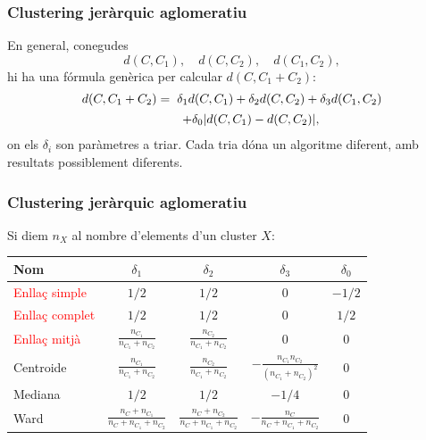 \documentclass[12pt,t]{beamer}
\newcommand{\red}[1]{\textcolor{red}{#1}}
\renewcommand{\emph}[1]{{\color{red}#1}}
\theoremstyle{plain}
\theoremstyle{definition}
\begin{document}
\begin{frame}
\frametitle{Clustering jeràrquic aglomeratiu}

En general, conegudes
$$
d(C,C_1),\quad d(C,C_2),\quad d(C_1,C_2),
$$
 hi ha una fórmula genèrica per calcular
$d(C,C_1+ C_2)$:
$$
\begin{array}{rl}
d(C,C_1+C_2)= &\hspace*{-1ex} \delta_1 d(C,C_1)+\delta_2 d(C,C_2)+\delta_3 d(C_1,C_2) \\[1ex] & + \delta_0 |d(C,C_1)-d(C,C_2)|,
\end{array}
$$
on els $\delta_i$ son paràmetres a triar.  Cada tria dóna un algoritme diferent, amb resultats possiblement diferents.

\end{frame}


\begin{frame}
\frametitle{Clustering jeràrquic aglomeratiu}
Si diem $n_X$ al nombre d'elements d'un cluster $X$:
\vskip 0.25cm

\begin{center}
\footnotesize \begin{tabular}{|l|@{}c|@{}c|@{}c|@{}c|}
\hline
Nom&$\delta_1$&$\delta_2$&$\delta_3$&$\delta_0$\\\hline
\red{Enllaç simple}\vphantom{$\displaystyle\int$} &$1/2$&$1/2$&$0$&$-1/2$\\\hline
\red{Enllaç complet}\vphantom{$\displaystyle\int$} &$1/2$&$1/2$&$0$&$1/2$\\\hline
\red{Enllaç mitjà}\vphantom{$\displaystyle\int_A^B$} &$\frac{n_{C_1}}{n_{C_1} + n_{C_2}}$&$\frac{n_{C_2}}{n_{C_1}+ n_{C_2}}$&$0$&$0$\\
\hline
Centroide\vphantom{$\displaystyle\int_A^B$} &$\frac{n_{C_1}}{n_{C_1} + n_{C_2}}$&$\frac{n_{C_2}}{n_{C_1} + n_{C_2}}$&$-\frac{n_{C_1} n_{C_2}}{(n_{C_1} + n_{C_2})^2}$&$0$\\\hline
Mediana\vphantom{$\displaystyle\int_A^B$} &$1/2$&$1/2$&$-1/4$&$0$\\\hline
\emph{Ward}\vphantom{$\displaystyle\int_A^B$} &$\frac{n_{C} + n_{C_1}}{n_C + n_{C_1} + n_{C_2}}$&$\frac{n_C + n_{C_2}}{n_C + n_{C_1}+ n_{C_2}}$&$-\frac{n_C}{n_C + n_{C_1} + n_{C_2}}$&$0$\\\hline
\end{tabular}
\end{center}
\end{frame}
\end{document}
